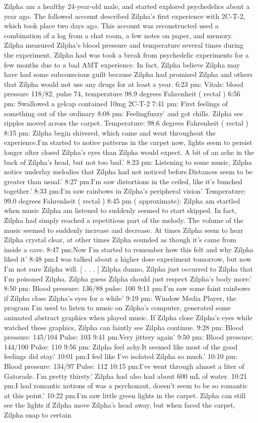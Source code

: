 \documentclass[12pt]{book}
\begin{document}
Zilpha am a healthy 24-year-old male, and started explored psychedelics about a year ago. The followed account described Zilpha's first experience with 2C-T-2, which took place two days ago. This account was reconstructed used a combination of a log from a chat room, a few notes on paper, and memory. Zilpha measured Zilpha's blood pressure and temperature several times during the experiment. Zilpha had was took a break from psychedelic experiments for a few months due to a bad AMT experience. In fact, Zilpha believe Zilpha may have had some subconscious guilt because Zilpha had promised Zilpha and others that Zilpha would not use any drugs for at least a year. 6:23 pm: Vitals: blood pressure 118/82, pulse 74, temperature 98.9 degrees Fahrenheit ( rectal ) 6:56 pm: Swallowed a gelcap contained 10mg 2C-T-2 7:41 pm: First feelings of something out of the ordinary 8:08 pm: Feelingfuzzy' and got chills. Zilpha see ripples moved across the carpet. Temperature: 98.6 degrees Fahrenheit ( rectal ) 8:15 pm: Zilpha begin shivered, which came and went throughout the experience.I'm started to notice patterns in the carpet now, lights seem to persist longer after closed Zilpha's eyes than Zilpha would expect. A bit of an ache in the back of Zilpha's head, but not too bad.' 8:23 pm: Listening to some music, Zilpha notice underlay melodies that Zilpha had not noticed before.Distances seem to be greater than usual.' 8:27 pm:I'm saw distortions in the ceiled, like it's bunched together.' 8:33 pm:I'm saw rainbows in Zilpha's peripheral vision' Temperature: 99.0 degrees Fahrenheit ( rectal ) 8:45 pm ( approximate): Zilpha am startled when music Zilpha am listened to suddenly seemed to start skipped. In fact, Zilpha had simply reached a repetitious part of the melody. The volume of the music seemed to suddenly increase and decrease. At times Zilpha seem to hear Zilpha crystal clear, at other times Zilpha sounded as though it's came from inside a cave. 8:47 pm:Now I'm started to remember how this felt and why Zilpha liked it' 8:48 pm:I was talked about a higher dose experiment tomorrow, but now I'm not sure Zilpha will. [ . . .  ] Zilpha dunno, Zilpha just occurred to Zilpha that I'm poisoned Zilpha. Zilpha guess Zilpha should just respect Zilpha's body more.' 8:50 pm: Blood pressure: 136/88 pulse: 100 9:11 pm:I'm saw some faint rainbows if Zilpha close Zilpha's eyes for a while' 9:19 pm: Window Media Player, the program I'm used to listen to music on Zilpha's computer, generated some animated abstract graphics when played music. If Zilpha close Zilpha's eyes while watched these graphics, Zilpha can faintly see Zilpha continue. 9:28 pm: Blood pressure: 145/104 Pulse: 103 9:41 pm:Very jittery again' 9:50 pm: Blood pressure: 144/100 Pulse: 110 9:56 pm: Zilpha feel achy.It seemed like most of the good feelings did stay.' 10:01 pm:I feel like I've isolated Zilpha so much.' 10:10 pm: Blood pressure: 134/97 Pulse: 112 10:15 pm:I've went through almost a liter of Gatorade. I'm pretty thirsty.' Zilpha had also had about 600 mL of water. 10:21 pm:I had romantic notions of was a psychonaut, doesn't seem to be so romantic at this point.' 10:22 pm:I'm saw little green lights in the carpet. Zilpha can still see the lights if Zilpha move Zilpha's head away, but when faced the carpet, Zilpha snap to certain 
\end{document}
